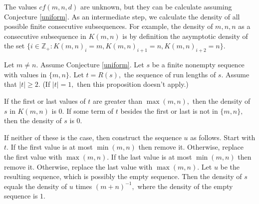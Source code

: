 \documentclass[11pt]{amsart} %
\begin{document}
The values $cf(m,n,d)$ are unknown, but they can be calculate assuming Conjecture \ref{uniform}. As an intermediate step, we calculate the density of all possible finite consecutive subsequences. For example, the density of $m,n,n$ as a consecutive subsequence in $K(m,n)$ is by definition the asymptotic density of the set $\{i \in \mathbb{Z}_+ : K(m,n)_i = m, K(m,n)_{i+1} = n, K(m,n)_{i+2}=n\}.$

\begin{proposition}\label{density-recursion} Let $m \neq n.$ Assume Conjecture \ref{uniform}. Let $s$ be a finite nonempty sequence with values in $\{m,n\}.$ Let $t = R(s),$ the sequence of run lengths of $s.$ Assume that $|t|\ge 2.$ (If $|t|=1,$ then this proposition doesn't apply.)

If the first or last values of $t$ are greater than $\max(m,n),$ then the density of $s$ in $K(m,n)$ is $0.$ If some term of $t$ besides the first or last is not in $\{m,n\},$ then the density of $s$ is $0.$ 

If neither of these is the case, then construct the sequence $u$ as follows. Start with $t.$ If the first value is at most $\min(m,n)$ then remove it. Otherwise, replace the first value with $\max(m,n).$ If the last value is at most $\min(m,n)$ then remove it. Otherwise, replace the last value with $\max(m,n).$ Let $u$ be the resulting sequence, which is possibly the empty sequence. Then the density of $s$ equals the density of $u$ times $(m+n)^{-1},$ where the density of the empty sequence is $1.$
\end{proposition}
\end{document}
